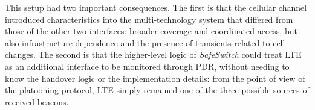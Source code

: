 This setup had two important consequences. The first is that the cellular channel introduced characteristics into the multi-technology system that differed from those of the other two interfaces: broader coverage and coordinated access, but also infrastructure dependence and the presence of transients related to cell changes. The second is that the higher-level logic of \emph{SafeSwitch} could treat LTE as an additional interface to be monitored through PDR, without needing to know the handover logic or the implementation details: from the point of view of the platooning protocol, LTE simply remained one of the three possible sources of received beacons.
